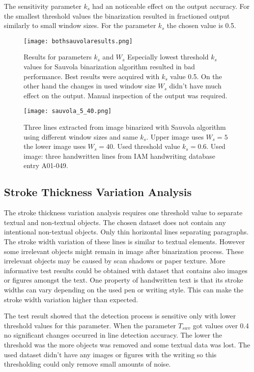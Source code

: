 \documentclass{article}
\begin{document}
    The sensitivity parameter $k_s$ had an noticeable effect on the output accuracy. For the smallest threshold values the binarization resulted in fractioned output similarly to small window sizes. For the parameter $k_s$ the chosen value is 0.5.

    \begin{figure}[!ht]
      \centering
      \texttt{[image: bothsauvolaresults.png]}
      \caption{Results for parameters $k_s$ and $W_s$ Especially lowest threshold $k_s$ values for Sauvola binarization algorithm resulted in bad performance. Best results were acquired with $k_s$ value 0.5. On the other hand the changes in used window size $W_s$ didn't have much effect on the output. Manual inspection of the output was required. \label{fig:sauvolaresults}}
    \end{figure}

    \begin{figure}[!ht]
      \centering
      \texttt{[image: sauvola\_5\_40.png]}
      \caption{Three lines extracted from image binarized with Sauvola algorithm using different window sizes and same $k_s$. Upper image uses $W_s = 5$  the lower image uses $W_s = 40$. Used threshold value $k_s = 0.6$. Used image: three handwritten lines from IAM handwriting database entry A01-049. \label{fig:sauvola540}}
    \end{figure}


    \subsection{Stroke Thickness Variation Analysis}
      The stroke thickness variation analysis requires one threshold value to separate textual and non-textual objects. The chosen dataset does not contain any intentional non-textual objects. Only thin horizontal lines separating paragraphs. The stroke width variation of these lines is similar to textual elements. However some irrelevant objects might remain in image after binarization process. These irrelevant objects may be caused by scan shadows or paper texture. More informative test results could be obtained with dataset that contains also images or figures amongst the text. One property of handwritten text is that its stroke widths can vary depending on the used pen or writing style. This can make the stroke width variation higher than expected.

      The test result showed that the detection process is sensitive only with lower threshold values for this parameter. When the parameter $T_{swv}$ got values over 0.4 no significant changes occurred in line detection accuracy. The lower the threshold was the more objects was removed and some textual data was lost. The used dataset didn't have any images or figures with the writing so this thresholding could only remove small amounts of noise.
\end{document}
